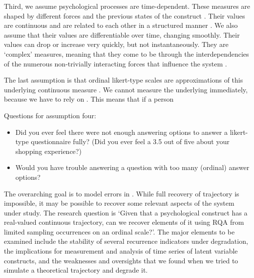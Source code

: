 \documentclass[utf8]{FrontiersinVancouver}
\begin{document}
Third, we assume psychological processes are time-dependent. These measures are shaped by different forces and the previous states of the construct \citep{olthofComplexityPsychologicalSelfratings2020b}. Their values are continuous and are related to each other in a structured manner \citep{bokerConsequencesContinuityHunt2002}. We also assume that their values are differentiable over time, changing smoothly. Their values can drop or increase very quickly, but not instantaneously. They are `complex' measures, meaning that they come to be through the interdependencies of the numerous non-trivially interacting forces that influence the system \citep{olthofComplexityTheoryPsychopathology2023}. 

The last assumption is that ordinal likert-type scales are approximations of this underlying continuous measure \citep{haslbeckRecoveringWithinpersonDynamics2022}. We cannot measure the underlying immediately, because we have to rely on . This means that if a person

\begin{framed}
    Questions for assumption four:
    \begin{itemize}
        \item Did you ever feel there were not enough answering options to answer a likert-type questionnaire fully? (Did you ever feel a 3.5 out of five about your shopping experience?)
        \item Would you have trouble answering a question with too many (ordinal) answer options?
    \end{itemize}
\end{framed}



The overarching goal is to model errors in . While full recovery of trajectory is impossible, it may be possible to recover some relevant aspects of the system under study. The research question is `Given that a psychological construct has a real-valued continuous trajectory, can we recover elements of it using RQA from limited sampling occurrences on an ordinal scale?'. The major elements to be examined include the stability of several recurrence indicators under degradation, the implications for measurement and analysis of time series of latent variable constructs, and the weaknesses and oversights that we found when we tried to simulate a theoretical trajectory and degrade it.  
\end{document}
